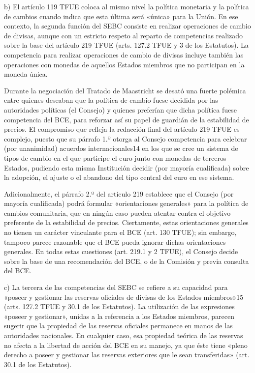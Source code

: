 \documentclass[10pt,a4paper]{article}
\begin{document}
b) El artículo 119 TFUE coloca al mismo nivel la política monetaria y la política de cambios cuando indica que esta última será «única» para la Unión. En ese contexto, la segunda función del SEBC consiste en realizar operaciones de cambio de divisas, aunque con un estricto respeto al reparto de competencias realizado sobre la base del artículo 219 TFUE (arts. 127.2 TFUE y 3 de los Estatutos). La competencia para realizar operaciones de cambio de divisas incluye también las operaciones con monedas de aquellos Estados miembros que no participan en la moneda única.

Durante la negociación del Tratado de Maastricht se desató una fuerte polémica entre quienes deseaban que la política de cambio fuese decidida por las autoridades políticas (el Consejo) y quienes preferían que dicha política fuese competencia del BCE, para reforzar así su papel de guardián de la estabilidad de precios. El compromiso que refleja la redacción final del artículo 219 TFUE es complejo, puesto que su párrafo 1.º otorga al Consejo competencia para celebrar (por unanimidad) acuerdos internacionales14 en los que se cree un sistema de tipos de cambio en el que participe el euro junto con monedas de terceros Estados, pudiendo esta misma Institución decidir (por mayoría cualificada) sobre la adopción, el ajuste o el abandono del tipo central del euro en ese sistema.

Adicionalmente, el párrafo 2.º del artículo 219 establece que el Consejo (por mayoría cualificada) podrá formular «orientaciones generales» para la política de cambios comunitaria, que en ningún caso pueden atentar contra el objetivo preferente de la estabilidad de precios. Ciertamente, estas orientaciones generales no tienen un carácter vinculante para el BCE (art. 130 TFUE); sin embargo, tampoco parece razonable que el BCE pueda ignorar dichas orientaciones generales. En todas estas cuestiones (art. 219.1 y 2 TFUE), el Consejo decide sobre la base de una recomendación del BCE, o de la Comisión y previa consulta del BCE.

c) La tercera de las competencias del SEBC se refiere a su capacidad para «poseer y gestionar las reservas oficiales de divisas de los Estados miembros»15 (arts. 127.2 TFUE y 30.1 de los Estatutos). La utilización de las expresiones «poseer y gestionar», unidas a la referencia a los Estados miembros, parecen sugerir que la propiedad de las reservas oficiales permanece en manos de las autoridades nacionales. En cualquier caso, esa propiedad teórica de las reservas no afecta a la libertad de acción del BCE en su manejo, ya que éste tiene «pleno derecho a poseer y gestionar las reservas exteriores que le sean transferidas» (art. 30.1 de los Estatutos).
\end{document}
